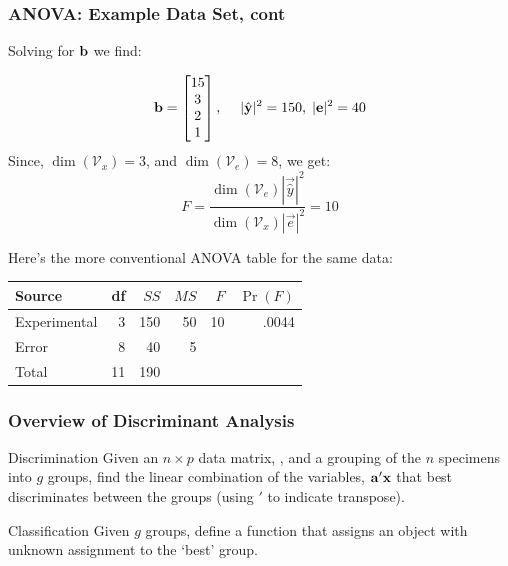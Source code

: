 \documentclass{beamer}
\begin{document}
\begin{frame}[fragile]
  \frametitle{ANOVA: Example Data Set, cont}
\small

Solving for $\mathbf{b}$ we find:

\begin{equation*}
\mathbf{b} = \begin{bmatrix}
15 \\ 3 \\ 2 \\ 1
\end{bmatrix},
\; \quad |\hat{\mathbf{y}}|^2 = 150, \;|\mathbf{e}|^2 = 40
\end{equation*}
Since, $\dim(\mathcal{V}_x) = 3$, and $\dim(\mathcal{V}_e)= 8$,  we get:
\begin{equation*}
  F = \frac{\dim(\mathcal{V}_e)|\vec{\hat{y}}|^2}
              {\dim(\mathcal{V}_x)|\vec{e}|^2}
    = 10
\end{equation*}

Here's the more conventional ANOVA table for the same data:
\footnotesize
\begin{center}
\begin{tabular}{lrrrrr}
  \toprule
 Source & df & $SS$ & $MS$ & $F$ & $\Pr(F)$ \\
  \midrule
 Experimental  & 3 & 150 & 50 & 10 & .0044\\
 Error  & 8  & 40 & 5 & \\
 \midrule
 Total & 11 & 190 & &\\
\bottomrule
\end{tabular}
\end{center}


\end{frame}



\begin{frame}
  \frametitle{Overview of Discriminant Analysis}

\begin{block}{Discrimination}
Given an $n \times p$ data matrix, , and a grouping of the $n$ specimens into $g$ groups, find the linear combination of the variables, $\mathbf{a}'\mathbf{x}$ that best discriminates between the groups (using $'$ to indicate transpose).
\end{block}

\begin{block}{Classification}
Given $g$ groups, define a function that assigns an object with unknown assignment to the `best' group.
\end{block}


\end{frame}
\end{document}
